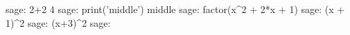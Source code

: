 \documentclass{article}
\begin{document}
	
	\begin{sageexample}
		sage: 2+2
		4
		sage: print('middle')
		middle
		sage: factor(x^2 + 2*x + 1)
		sage: (x + 1)^2
		sage: (x+3)^2
		sage: 
	\end{sageexample}


	
\end{document}
